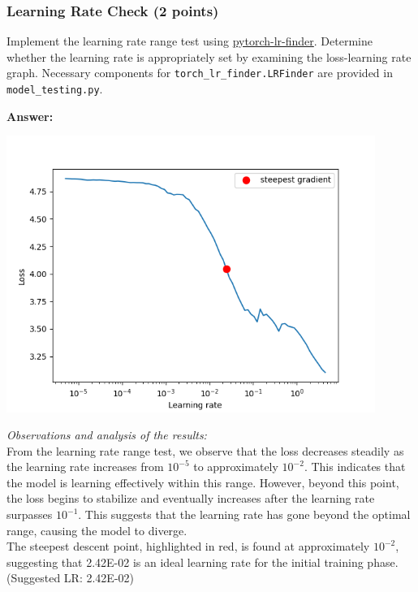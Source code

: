 \documentclass[11pt, oneside]{article}   	%
\begin{document}
\newpage

\subsubsection*{Learning Rate Check (2 points)}
Implement the learning rate range test using \href{https://github.com/davidtvs/pytorch-lr-finder#tweaked-version-from-fastaiauto}{pytorch-lr-finder}. Determine whether the learning rate is appropriately set by examining the loss-learning rate graph. Necessary components for \texttt{torch\_lr\_finder.LRFinder} are provided in \texttt{model\_testing.py}.

\textbf{Answer:} \\
\begin{center}
    \includegraphics[width=0.9\textwidth]{report_pic/learningRate.png}
\end{center}

\textit{Observations and analysis of the results: }
\\
From the learning rate range test, we observe that the loss decreases steadily as the learning rate increases from $10^{-5}$ to approximately $10^{-2}$. 
This indicates that the model is learning effectively within this range. However, beyond this point, the loss begins to stabilize and eventually increases after the learning rate surpasses $10^{-1}$. 
This suggests that the learning rate has gone beyond the optimal range, causing the model to diverge. 
\\
The steepest descent point, highlighted in red, is found at approximately $10^{-2}$, suggesting that 2.42E-02 is an ideal learning rate for the initial training phase. (Suggested LR: 2.42E-02)
\end{document}

